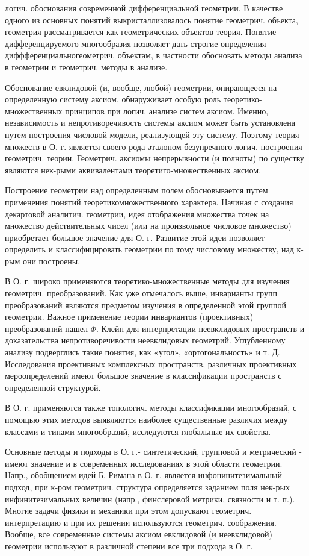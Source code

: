 \documentclass[10pt]{article}
\begin{document}
логич. обоснования современной дифференциальной геометрии. В качестве одного из основных понятий выкристаллизовалось понятие геометрич. объекта, геометрия рассматривается как геометрических объектов теория. Понятие дифференцируемого многообразия позволяет дать строгие определения диффференциальногеометрич. объектам, в частности обосновать методы анализа в геометрии и геометрич. методы в анализе.

Обоснование евклидовой (и, вообще, любой) геометрии, опирающееся на определенную систему аксиом, обнаруживает особую роль теоретико-множественных принципов при логич. анализе систем аксиом. Именно, независимость и непротиворечивость системы аксиом может быть установлена путем построения числовой модели, реализующей эту систему. Поэтому теория множеств в О. г. является своего рода әталоном безупречного логич. построения геометрич. теории. Геометрич. аксиомы непрерывности (и полноты) по существу являются нек-рыми әквивалентами теоретиго-множественных аксиом.

Построение геометрии над определенным полем обосновывается путем применения понятий теоретикомножественного характера. Начиная с создания декартовой аналитич. геометрии, идея отображения множества точек на множество действительных чисел (или на произвольное числовое множество) приобретает большое значение для О. г. Развитие этой идеи позволяет определить и классифицировать геометрии по тому числовому множеству, над к-рым они построены.

В О. г. широко применяются теоретико-множественные методы для изучения геометрич. преобразований. Как уже отмечалось выше, инварианты групп преобразований являются предметом изучения в определенной этой группой геометрии. Важное применение теории инвариантов (проективных) преобразований нашел $\Phi$. Клейн для интерпретации неевклидовых пространств и доказательства непротиворечивости неевклидовых геометрий. Углубленному анализу подверглись такие понятия, как «угол», «ортогональность» и т. Д. Исследования проективных комплексных пространств, различных проективных мероопределений имеют большое значение в классификации пространств с определенной структурой.

В О. г. применяются также топологич. методы классификации многообразий, с помощью этих методов выявляются наиболее существенные различия между классами и типами многообразий, исследуются глобальные их свойства.

Основные методы и подходы в О. г.- синтетический, групповой и метрический - имеют значение и в современных исследованиях в этой области геометрии. Напр., обобщением идей Б. Римана в О. г. является инфонинитезимальный подход, при к-ром геометрич. структура определяется заданием поля нек-рых инфинитезимальных величин (напр., финслеровой метрики, связности и т. п.). Многие задачи физики и механики при этом допускают геометрич. интерпретацию и при их решении используются геометрич. соображения. Вообще, все современные системы аксиом евклидовой (и неевклидовой) геометрии используют в различной степени все три подхода в О. г.
\end{document}
